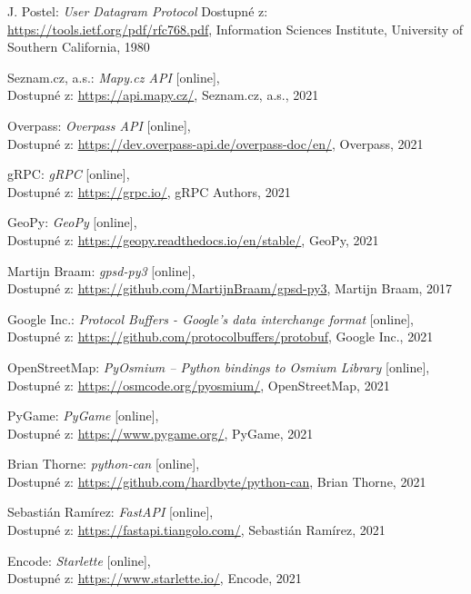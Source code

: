 \documentclass[czech, bachelor]{diploma}
\begin{document}
\begin{thebibliography}{50}
J. Postel: \textit{User Datagram Protocol}
Dostupné z:
\url{https://tools.ietf.org/pdf/rfc768.pdf},
Information Sciences Institute, University of Southern California, 1980

Seznam.cz, a.s.: \textit{Mapy.cz API} [online], \\
Dostupné z:
\url{https://api.mapy.cz/},
Seznam.cz, a.s., 2021

Overpass: \textit{Overpass API} [online], \\
Dostupné z:
\url{https://dev.overpass-api.de/overpass-doc/en/},
Overpass, 2021

gRPC: \textit{gRPC} [online], \\
Dostupné z:
\url{https://grpc.io/},
gRPC Authors, 2021

GeoPy: \textit{GeoPy} [online], \\
Dostupné z:
\url{https://geopy.readthedocs.io/en/stable/},
GeoPy, 2021

Martijn Braam: \textit{gpsd-py3} [online], \\
Dostupné z:
\url{https://github.com/MartijnBraam/gpsd-py3},
Martijn Braam, 2017

Google Inc.: \textit{Protocol Buffers - Google's data interchange format} [online], \\
Dostupné z:
\url{https://github.com/protocolbuffers/protobuf},
Google Inc., 2021

OpenStreetMap: \textit{PyOsmium -- Python bindings to Osmium Library} [online], \\
Dostupné z:
\url{https://osmcode.org/pyosmium/},
OpenStreetMap, 2021

PyGame: \textit{PyGame} [online], \\
Dostupné z:
\url{https://www.pygame.org/},
PyGame, 2021

Brian Thorne: \textit{python-can} [online], \\
Dostupné z:
\url{https://github.com/hardbyte/python-can},
Brian Thorne, 2021

Sebastián Ramírez: \textit{FastAPI} [online], \\
Dostupné z:
\url{https://fastapi.tiangolo.com/},
Sebastián Ramírez, 2021

Encode: \textit{Starlette} [online], \\
Dostupné z:
\url{https://www.starlette.io/},
Encode, 2021


\end{thebibliography}
\end{document}
